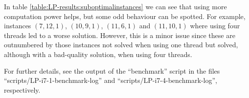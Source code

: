 In table \ref{table:LP-results:suboptimalinstances} we can see that using more
computation power helps, but some odd behaviour can be spotted. For example,
instances $(7,12,1)$, $(10,9,1)$, $(11,6,1)$ and $(11,10,1)$  where using four
threads led to a worse solution. However, this is a minor issue since these are
outnumbered by those instances not solved when using one thread but solved,
although with a bad-quality solution, when using four threads.

\hfill

For further details, see the output of the ``benchmark'' script in the files
``scripts/LP-i7-1-benchmark-log'' and ``scripts/LP-i7-4-benchmark-log'', respectively.

